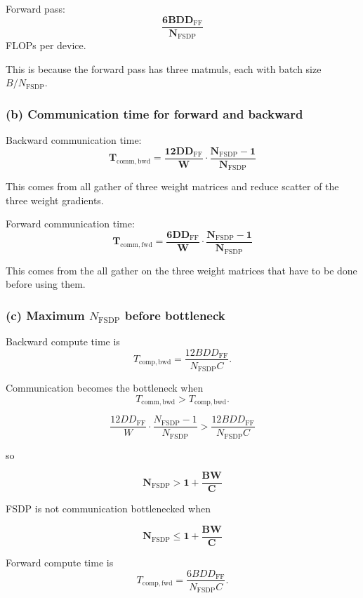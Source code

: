 \documentclass[11pt]{article}
\begin{document}
Forward pass:
\[
\mathbf{
\frac{6 B D D_{\mathrm{FF}}}{N_{\mathrm{FSDP}}}
}
\]
FLOPs per device.

This is because the forward pass has three matmuls, each with batch size
\(B/N_{\mathrm{FSDP}}\).

\vspace{4em}

\subsubsection*{(b) Communication time for forward and backward}

Backward communication time:
\[
\mathbf{
T_{\mathrm{comm,bwd}}
=
\frac{12 D D_{\mathrm{FF}}}{W}
\cdot
\frac{N_{\mathrm{FSDP}} - 1}{N_{\mathrm{FSDP}}}
}
\]

This comes from all gather of three weight matrices and reduce scatter of the three weight gradients.

Forward communication time:
\[
\mathbf{
T_{\mathrm{comm,fwd}}
=
\frac{6 D D_{\mathrm{FF}}}{W}
\cdot
\frac{N_{\mathrm{FSDP}} - 1}{N_{\mathrm{FSDP}}}
}
\]

This comes from the all gather on the three weight matrices that have to be done before using them.

\vspace{4em}

\subsubsection*{(c) Maximum $N_{\text{FSDP}}$ before bottleneck}

Backward compute time is
\[
T_{\mathrm{comp,bwd}}
=
\frac{12 B D D_{\mathrm{FF}}}{N_{\mathrm{FSDP}} C}.
\]

Communication becomes the bottleneck when
\[
T_{\mathrm{comm,bwd}} > T_{\mathrm{comp,bwd}}.
\]

\[
\frac{12 D D_{\mathrm{FF}}}{W}
\cdot
\frac{N_{\mathrm{FSDP}} - 1}{N_{\mathrm{FSDP}}}
>
\frac{12 B D D_{\mathrm{FF}}}{N_{\mathrm{FSDP}} C}
\]

so

\[
\mathbf{
N_{\mathrm{FSDP}} > 1 + \frac{B W}{C}
}
\]

FSDP is not communication bottlenecked when

\[
\mathbf{
N_{\mathrm{FSDP}} \le 1 + \frac{B W}{C}
}
\]

Forward compute time is
\[
T_{\mathrm{comp,fwd}}
=
\frac{6 B D D_{\mathrm{FF}}}{N_{\mathrm{FSDP}} C}.
\]
\end{document}
